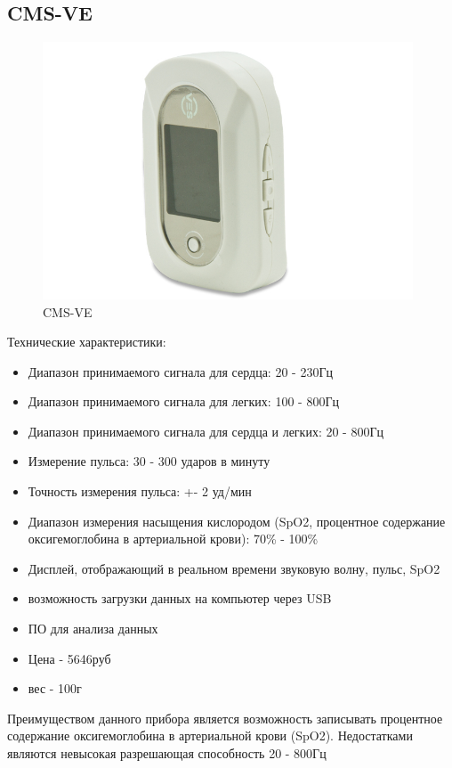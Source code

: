 \documentclass[../paper.tex]{subfiles}
\begin{document}
\subsection{CMS-VE}
\begin{figure}[H]
\centering
\includegraphics[width=11cm]{images/cms-ve}
\caption{CMS-VE}
\end{figure}

Технические характеристики:\cite{cms-ve}
\begin{itemize}
  \item Диапазон принимаемого сигнала для сердца: 20 - 230Гц
  \item Диапазон принимаемого сигнала для легких: 100 - 800Гц
  \item Диапазон принимаемого сигнала для сердца и легких: 20 - 800Гц
  \item Измерение пульса: 30 - 300 ударов в минуту
  \item Точность измерения пульса: +- 2 уд/мин
  \item Диапазон измерения насыщения кислородом (SpO2, процентное содержание оксигемоглобина в артериальной крови): 70\% - 100\%
  \item Дисплей, отображающий в реальном времени звуковую волну, пульс, SpO2
  \item возможность загрузки данных на компьютер через USB
  \item ПО для анализа данных
  \item Цена - 5646руб
  \item вес - 100г
\end{itemize}

Преимуществом данного прибора является возможность записывать процентное содержание оксигемоглобина в артериальной крови (SpO2). Недостатками являются невысокая разрешающая способность 20 - 800Гц
\end{document}

